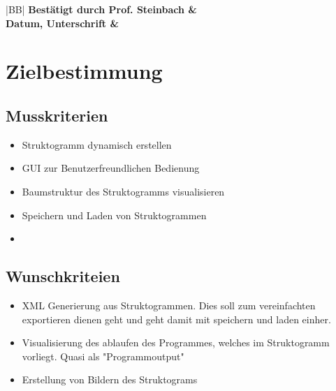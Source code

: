 \documentclass[a4paper,10pt]{report}
\begin{document}
\begin{titlepage}
\begin{center}
\begin{tabular}{|c|l|l|l|l|}
\end{tabular}
\end{center}

\vspace{10mm}

\begin{center}
\begin{tabular}{|BB|}
\hline
\bfseries \large Best\"{a}tigt durch Prof. Steinbach & \quad \quad \quad \quad \quad \quad \quad \quad \quad \\
\bfseries \large Datum, Unterschrift &
\\
\hline
\end{tabular}
\end{center}

\end{titlepage}

\newpage
\renewcommand{\thesection}{\arabic{section}}

\tableofcontents 
\newpage
\section{Zielbestimmung}
\subsection{Musskriterien}
\begin{itemize}
\item Struktogramm dynamisch erstellen
\item GUI zur Benutzerfreundlichen Bedienung
\item Baumstruktur des Struktogramms visualisieren
\item Speichern und Laden von Struktogrammen
\item 
\end{itemize}
\subsection{Wunschkriteien}
\begin{itemize}
\item XML Generierung aus Struktogrammen. Dies soll zum vereinfachten exportieren dienen geht und geht damit mit speichern und laden einher.
\item Visualisierung des ablaufen des Programmes, welches im Struktogramm vorliegt. Quasi als "Programmoutput"
\item Erstellung von Bildern des Struktograms
\end{itemize}
\end{document}
